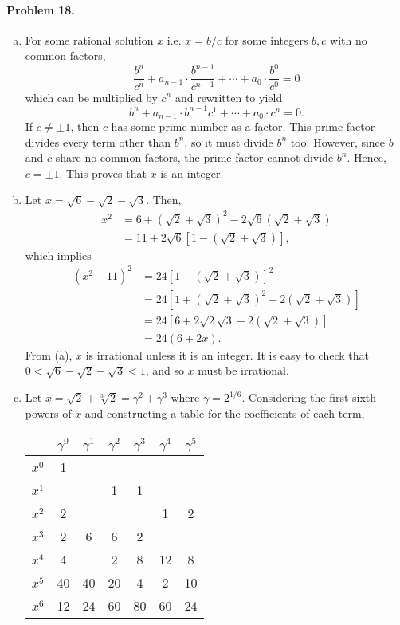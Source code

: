 \documentclass{article}
\begin{document}
\paragraph{Problem 18.}
\begin{enumerate}[(a)]
  \item For some rational solution $x$ i.e. $x = b/c$ for some integers $b, c$
    with no common factors, \[
      \frac{b^n}{c^n} + a_{n-1} \cdot \frac{b^{n-1}}{c^{n-1}} + \cdots + a_0
      \cdot \frac{b^0}{c^0} = 0
    \] which can be multiplied by $c^n$ and rewritten to yield \[
      b^n + a_{n-1} \cdot b^{n-1}c^1 + \cdots + a_0 \cdot c^n = 0.
    \] If $c \neq \pm 1$, then $c$ has some prime number as a factor. This
    prime factor divides every term other than $b^n$, so it must divide $b^n$
    too. However, since $b$ and $c$ share no common factors, the prime factor
    cannot divide $b^n$. Hence, $c = \pm 1$. This proves that $x$ is an
    integer.
  \item Let $x = \sqrt{6} - \sqrt{2} - \sqrt{3}$. Then,
    \begin{align*}
      x^2 &= 6 + (\sqrt{2} + \sqrt{3})^2 - 2\sqrt{6}(\sqrt{2} + \sqrt{3}) \\
          &= 11 + 2\sqrt{6}[1 - (\sqrt{2} + \sqrt{3})],
    \end{align*}
    which implies
    \begin{align*}
      (x^2 - 11)^2
      &= 24[1 - (\sqrt{2} + \sqrt{3})]^2 \\
      &= 24[1 + (\sqrt{2} + \sqrt{3})^2 - 2(\sqrt{2} + \sqrt{3})] \\
      &= 24[6 + 2\sqrt{2}\sqrt{3} - 2(\sqrt{2} + \sqrt{3})] \\
      &= 24(6 + 2x).
    \end{align*}
    From (a), $x$ is irrational unless it is an integer. It is easy to check
    that $0 < \sqrt{6} - \sqrt{2} - \sqrt{3} < 1$, and so $x$ must be
    irrational.
  \item Let $x = \sqrt{2} + \sqrt[3]{2} = \gamma^2 + \gamma^3$ where $\gamma =
    2^{1/6}$. Considering the first sixth powers of $x$ and constructing a
    table for the coefficients of each term,

    \begin{tabular}{c | c c c c c c}
      & $\gamma^0$ & $\gamma^1$ & $\gamma^2$ & $\gamma^3$ & $\gamma^4$ &
      $\gamma^5$ \\
      \hline
      $x^0$ & 1 & & & & & \\
      $x^1$ & & & 1 & 1 & & \\
      $x^2$ & 2 & & & & 1 & 2 \\
      $x^3$ & 2 & 6 & 6 & 2 & & \\
      $x^4$ & 4 & & 2 & 8 & 12 & 8 \\
      $x^5$ & 40 & 40 & 20 & 4 & 2 & 10 \\
      $x^6$ & 12 & 24 & 60 & 80 & 60 & 24 \\
    \end{tabular}


\end{enumerate}
\end{document}
